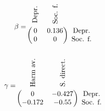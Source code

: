 \documentclass[11pt]{article}
\begin{document}
\begin{minipage}{0.26\linewidth}
\[
\beta = 
\begin{blockarray}{ccc}
\rotatebox[]{90}{\textrm{\:\:Depr.}} & \rotatebox[]{90}{\textrm{\:\:Soc. f.}} & \\
\begin{block}{(cc)c}
  0     & 0.136 & \textrm{Depr.} \\
  0     & 0     & \textrm{Soc. f.} \\
\end{block}
\end{blockarray}
\]
\end{minipage}
\begin{minipage}{0.57\linewidth}
\[
\gamma = 
\begin{blockarray}{ccc}
\rotatebox[]{90}{\textrm{\:\:Harm av.}} & \rotatebox[]{90}{\textrm{\:\:S. direct.}} & \\
\begin{block}{(cc)c}
  0      & -0.427 & \textrm{Depr.} \\
  -0.172 & -0.55  & \textrm{Soc. f.} \\
\end{block}
\end{blockarray}
\]
\end{minipage}
\end{document}
